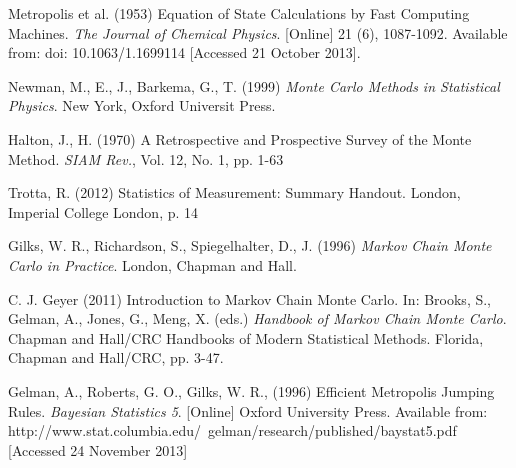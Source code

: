 \documentclass[a4paper,11pt,twoside]{article}
\begin{document}
\begin{thebibliography}{10}


		Metropolis et al. (1953) Equation of State Calculations by Fast
		Computing Machines. \textit{The Journal of Chemical Physics}.
		[Online] 21 (6), 1087-1092. Available from: doi:
		10.1063/1.1699114 [Accessed 21 October 2013].

		Newman, M., E., J., Barkema, G., T. (1999) \textit{Monte Carlo
		Methods in Statistical Physics}. New York, Oxford Universit
		Press.


		Halton, J., H. (1970) A Retrospective and Prospective Survey of
		the Monte Method. \textit{SIAM Rev.}, Vol. 12, No. 1, pp. 1-63
	
		Trotta, R. (2012) Statistics of Measurement: Summary Handout.
		London, Imperial College London, p. 14

		Gilks, W. R., Richardson, S., Spiegelhalter, D., J. (1996)
		\textit{Markov Chain Monte Carlo in Practice}. London, Chapman
		and Hall.

		C. J. Geyer (2011) Introduction to Markov Chain Monte Carlo.
		In: Brooks, S., Gelman, A., Jones, G., Meng, X. (eds.)
		\textit{Handbook of Markov Chain Monte Carlo}. Chapman and
		Hall/CRC Handbooks of Modern Statistical Methods. Florida,
		Chapman and Hall/CRC, pp. 3-47.
	
		Gelman, A., Roberts, G. O., Gilks, W. R., (1996) Efficient
		Metropolis Jumping Rules. \textit{Bayesian Statistics 5}. [Online]
		Oxford University Press. Available from:
		http://www.stat.columbia.edu/~gelman/research/published/baystat5.pdf
		[Accessed 24 November 2013]



\end{thebibliography}
\end{document}
